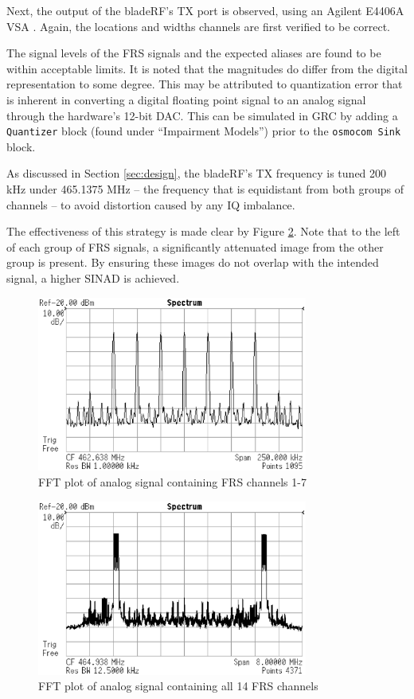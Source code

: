 Next, the output of the bladeRF's \ac{TX} port is observed, using an
Agilent E4406A \ac{VSA} \cite{VSA}. Again, the locations and widths channels
are first verified to be correct.

The signal levels of the \ac{FRS} signals and the expected aliases are found to
be within acceptable limits. It is noted that the magnitudes do differ from the
digital representation to some degree. This may be attributed to quantization
error that is inherent in converting a digital floating point signal to an
analog signal through the hardware's 12-bit \ac{DAC}. This can be simulated in
\ac{GRC} by adding a \texttt{Quantizer} block (found under ``Impairment
Models'') prior to the \texttt{osmocom Sink} block.

As discussed in Section \ref{sec:design}, the bladeRF's \ac{TX} frequency
is tuned 200 kHz under 465.1375 MHz -- the frequency that is equidistant from both
groups of channels -- to avoid distortion caused by any IQ imbalance.

The effectiveness of this strategy is made clear by Figure \ref{fig:vsa-all}.
Note that to the left of each group of \ac{FRS} signals, a significantly
attenuated image from the other group is present. By ensuring these images
do not overlap with the intended signal, a higher \ac{SINAD} is achieved.

\begin{figure}[h]
  \centering
  \includegraphics[width=3.5in]{images/frs/results/ch1-7.eps}
  \caption{FFT plot of analog signal containing FRS channels 1-7}
  \label{fig:vsa-ch1-7}
\end{figure}

\begin{figure}[h]
  \centering
  \includegraphics[width=3.5in]{images/frs/results/all_ch_enabled.eps}
  \caption{FFT plot of analog signal containing all 14 FRS channels}
  \label{fig:vsa-all}
\end{figure}

